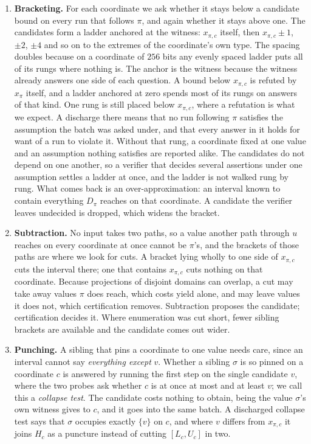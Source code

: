 \documentclass[manuscript,anonymous]{acmart}
\begin{document}
\begin{enumerate}
\item \textbf{Bracketing.} For each coordinate we ask whether it stays below a
candidate bound on every run that follows $\pi$, and again whether it stays
above one. The candidates form a ladder anchored at the witness:
$x_{\pi,c}$ itself, then $x_{\pi,c} \pm 1$, $\pm 2$, $\pm 4$ and so on to the
extremes of the coordinate's own type. The spacing doubles because on a
coordinate of $256$ bits any evenly spaced ladder puts all of its rungs where
nothing is. The anchor is the witness because the witness already answers one
side of each question. A bound below $x_{\pi,c}$ is refuted by $x_\pi$ itself,
and a ladder anchored at zero spends most of its rungs on answers of that kind.
One rung is still placed below $x_{\pi,c}$, where a refutation is what we
expect. A discharge there means that no run following $\pi$ satisfies the
assumption the batch was asked under, and that every answer in it holds for want
of a run to violate it. Without that rung, a coordinate fixed at one value and
an assumption nothing satisfies are reported alike. The candidates do not depend on one another, so a verifier that
decides several assertions under one assumption settles a ladder at once, and
the ladder is not walked rung by rung. What comes back is an
over-approximation: an interval known to contain everything $D_\pi$ reaches on
that coordinate. A candidate the verifier leaves undecided is dropped, which
widens the bracket.

\item \textbf{Subtraction.} No input takes two paths, so a value another path
through $u$ reaches on every coordinate at once cannot be $\pi$'s, and the
brackets of those paths are where we look for cuts. A bracket lying wholly to
one side of $x_{\pi,c}$ cuts the interval there; one that contains $x_{\pi,c}$
cuts nothing on that coordinate. Because projections of disjoint domains can
overlap, a cut may take away values $\pi$ does reach, which costs yield alone,
and may leave values it does not, which certification removes. Subtraction
proposes the candidate; certification decides it. Where enumeration was cut
short, fewer sibling brackets are available and the candidate comes out wider.

\item \textbf{Punching.} A sibling that pins a coordinate to one value needs
care, since an interval cannot say \emph{everything except} $v$. Whether a
sibling $\sigma$ is so pinned on a coordinate $c$ is answered by running the
first step on the single candidate $v$, where the two probes ask whether $c$ is
at once at most and at least $v$; we call this a \emph{collapse test}. The
candidate costs nothing to obtain, being the value $\sigma$'s own witness gives
to $c$, and it goes into the same batch. A discharged collapse test says that
$\sigma$ occupies exactly $\{v\}$ on $c$, and where $v$ differs from
$x_{\pi,c}$ it joins $H_c$ as a puncture instead of cutting $[L_c, U_c]$ in
two.
\end{enumerate}
\end{document}
